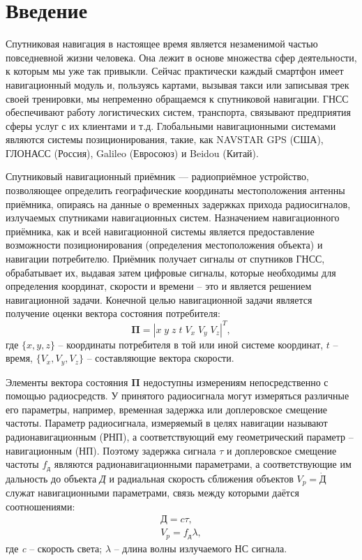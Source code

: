 \chapter*{Введение}


Спутниковая навигация в настоящее время является незаменимой частью повседневной жизни человека. Она лежит в основе множества сфер деятельности, к которым мы уже так привыкли. Сейчас практически каждый смартфон имеет навигационный модуль и, пользуясь картами, вызывая такси или записывая трек своей тренировки, мы непременно обращаемся к спутниковой навигации. ГНСС обеспечивают работу логистических систем, транспорта, связывают предприятия сферы услуг с их клиентами и т.д. Глобальными навигационными системами являются системы позиционирования, такие, как NAVSTAR GPS (США), ГЛОНАСС (Россия), Galileo (Евросоюз) и Beidou (Китай)\cite{korogodin}. 

Спутниковый навигационный приёмник --- радиоприёмное устройство, позволяющее определить
географические координаты местоположения антенны приёмника, опираясь на данные о временных задержках прихода радиосигналов, излучаемых
спутниками навигационных систем. Назначением навигационного приёмника, как и всей навигационной системы является предоставление возможности позиционирования (определения местоположения объекта) и навигации потребителю. Приёмник получает сигналы от спутников ГНСС, обрабатывает их, выдавая затем цифровые сигналы, которые необходимы для определения координат, скорости и времени -- это и является решением навигационной задачи. Конечной целью навигационной задачи является получение оценки вектора состояния потребителя:
\begin{equation}
	\mathbf{\Pi} = |x\;y\;z\;t\;V_x\;V_y\;V_z|^T,
\end{equation}
где $\{x,y,z\}$ -- координаты потребителя в той или иной системе координат, $t$ -- время, $\{V_x,V_y,V_z\}$ -- составляющие вектора скорости.

Элементы вектора состояния $\mathbf{\Pi}$ недоступны измерениям непосредственно с помощью радиосредств. У принятого радиосигнала могут измеряться различные его параметры, например, временная задержка или доплеровское смещение частоты. Параметр радиосигнала, измеряемый в целях навигации называют радионавигационным (РНП), а соответствующий ему геометрический параметр -- навигационным (НП). Поэтому задержка сигнала $\tau$ и доплеровское смещение частоты $f_{д}$ являются радионавигационными параметрами, а соответствующие им дальность до объекта \textit{Д} и радиальная скорость сближения объектов $V_p = \dot{Д}$ служат навигационными параметрами, связь между которыми даётся соотношениями:
\begin{equation}
	\begin{split}
	\textit{Д} = c \tau, \\
	V_p = f_{д} \lambda,
	\end{split}
\end{equation}
где \textit{c} -- скорость света; $\lambda$ -- длина волны излучаемого НС сигнала.

